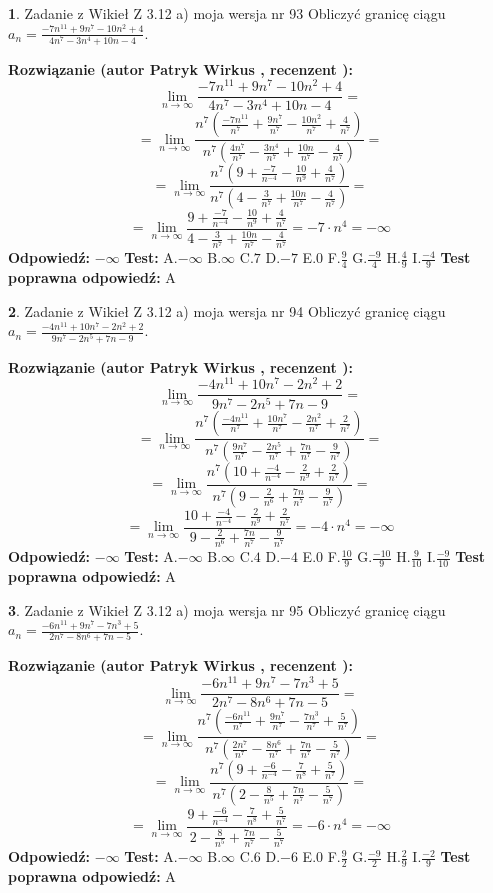 \documentclass[12pt, a4paper]{article}
\theoremstyle{definition} %
\newtheorem{zad}{}
\newcommand{\zadStart}[1]{\begin{zad}#1\newline}
\newcommand{\zadStop}{\end{zad}}
\newcommand{\rozwStart}[2]{\noindent \textbf{Rozwiązanie (autor #1 , recenzent #2): }\newline}
\newcommand{\rozwStop}{\newline}
\newcommand{\odpStart}{\noindent \textbf{Odpowiedź:}\newline}
\newcommand{\odpStop}{\newline}
\newcommand{\testStart}{\noindent \textbf{Test:}\newline}
\newcommand{\testStop}{\newline}
\newcommand{\kluczStart}{\noindent \textbf{Test poprawna odpowiedź:}\newline}
\newcommand{\kluczStop}{\newline}
\begin{document}
\zadStart{Zadanie z Wikieł Z 3.12 a) moja wersja nr 93}
Obliczyć granicę ciągu $a_{n}=\frac{-7n^{11}+9n^{7}-10n^{2}+4}{4n^{7}-3n^{4}+10n-4}$.
\zadStop
\rozwStart{Patryk Wirkus}{}
$$\lim\limits_{n\to\infty}\frac{-7n^{11}+9n^{7}-10n^{2}+4}{4n^{7}-3n^{4}+10n-4}=$$
$$=\lim\limits_{n\to\infty}\frac{n^{7}\left(\frac{-7n^{11}}{n^{7}}+\frac{9n^{7}}{n^{7}}-\frac{10n^{2}}{n^{7}}+\frac{4}{n^{7}}\right)}{n^{7}\left(\frac{4n^{7}}{n^{7}}-\frac{3n^{4}}{n^{7}}+\frac{10n}{n^{7}}-\frac{4}{n^{7}}\right)}=$$
$$=\lim\limits_{n\to\infty}\frac{n^{7}\left(9+\frac{-7}{n^{-4}}-\frac{10}{n^{9}}+\frac{4}{n^{7}}\right)}
{n^{7}\left(4-\frac{3}{n^{7}}+\frac{10n}{n^{7}}-\frac{4}{n^{7}}\right)}=$$
$$=\lim\limits_{n\to\infty}\frac{9+\frac{-7}{n^{-4}}-\frac{10}{n^{9}}+\frac{4}{n^{7}}}{4-\frac{3}{n^{7}}+\frac{10n}{n^{7}}-\frac{4}{n^{7}}}=-7\cdot n^{4} = -\infty$$
\rozwStop
\odpStart
$-\infty$
\odpStop
\testStart
A.$-\infty$
B.$\infty$
C.$7$
D.$-7$
E.$0$
F.$\frac{9}{4}$
G.$\frac{-9}{4}$
H.$\frac{4}{9}$
I.$\frac{-4}{9}$
\testStop
\kluczStart
A
\kluczStop



\zadStart{Zadanie z Wikieł Z 3.12 a) moja wersja nr 94}
Obliczyć granicę ciągu $a_{n}=\frac{-4n^{11}+10n^{7}-2n^{2}+2}{9n^{7}-2n^{5}+7n-9}$.
\zadStop
\rozwStart{Patryk Wirkus}{}
$$\lim\limits_{n\to\infty}\frac{-4n^{11}+10n^{7}-2n^{2}+2}{9n^{7}-2n^{5}+7n-9}=$$
$$=\lim\limits_{n\to\infty}\frac{n^{7}\left(\frac{-4n^{11}}{n^{7}}+\frac{10n^{7}}{n^{7}}-\frac{2n^{2}}{n^{7}}+\frac{2}{n^{7}}\right)}{n^{7}\left(\frac{9n^{7}}{n^{7}}-\frac{2n^{5}}{n^{7}}+\frac{7n}{n^{7}}-\frac{9}{n^{7}}\right)}=$$
$$=\lim\limits_{n\to\infty}\frac{n^{7}\left(10+\frac{-4}{n^{-4}}-\frac{2}{n^{9}}+\frac{2}{n^{7}}\right)}
{n^{7}\left(9-\frac{2}{n^{6}}+\frac{7n}{n^{7}}-\frac{9}{n^{7}}\right)}=$$
$$=\lim\limits_{n\to\infty}\frac{10+\frac{-4}{n^{-4}}-\frac{2}{n^{9}}+\frac{2}{n^{7}}}{9-\frac{2}{n^{6}}+\frac{7n}{n^{7}}-\frac{9}{n^{7}}}=-4\cdot n^{4} = -\infty$$
\rozwStop
\odpStart
$-\infty$
\odpStop
\testStart
A.$-\infty$
B.$\infty$
C.$4$
D.$-4$
E.$0$
F.$\frac{10}{9}$
G.$\frac{-10}{9}$
H.$\frac{9}{10}$
I.$\frac{-9}{10}$
\testStop
\kluczStart
A
\kluczStop



\zadStart{Zadanie z Wikieł Z 3.12 a) moja wersja nr 95}
Obliczyć granicę ciągu $a_{n}=\frac{-6n^{11}+9n^{7}-7n^{3}+5}{2n^{7}-8n^{6}+7n-5}$.
\zadStop
\rozwStart{Patryk Wirkus}{}
$$\lim\limits_{n\to\infty}\frac{-6n^{11}+9n^{7}-7n^{3}+5}{2n^{7}-8n^{6}+7n-5}=$$
$$=\lim\limits_{n\to\infty}\frac{n^{7}\left(\frac{-6n^{11}}{n^{7}}+\frac{9n^{7}}{n^{7}}-\frac{7n^{3}}{n^{7}}+\frac{5}{n^{7}}\right)}{n^{7}\left(\frac{2n^{7}}{n^{7}}-\frac{8n^{6}}{n^{7}}+\frac{7n}{n^{7}}-\frac{5}{n^{7}}\right)}=$$
$$=\lim\limits_{n\to\infty}\frac{n^{7}\left(9+\frac{-6}{n^{-4}}-\frac{7}{n^{8}}+\frac{5}{n^{7}}\right)}
{n^{7}\left(2-\frac{8}{n^{5}}+\frac{7n}{n^{7}}-\frac{5}{n^{7}}\right)}=$$
$$=\lim\limits_{n\to\infty}\frac{9+\frac{-6}{n^{-4}}-\frac{7}{n^{8}}+\frac{5}{n^{7}}}{2-\frac{8}{n^{5}}+\frac{7n}{n^{7}}-\frac{5}{n^{7}}}=-6\cdot n^{4} = -\infty$$
\rozwStop
\odpStart
$-\infty$
\odpStop
\testStart
A.$-\infty$
B.$\infty$
C.$6$
D.$-6$
E.$0$
F.$\frac{9}{2}$
G.$\frac{-9}{2}$
H.$\frac{2}{9}$
I.$\frac{-2}{9}$
\testStop
\kluczStart
A
\kluczStop
\end{document}
